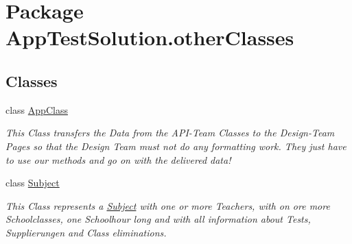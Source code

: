 \hypertarget{namespace_app_test_solution_1_1other_classes}{\section{Package App\-Test\-Solution.\-other\-Classes}
\label{namespace_app_test_solution_1_1other_classes}
}
\subsection*{Classes}
\begin{DoxyCompactItemize}
\item 
class \hyperlink{class_app_test_solution_1_1other_classes_1_1_app_class}{App\-Class}
\begin{DoxyCompactList}\small\item\em This Class transfers the Data from the A\-P\-I-\/\-Team Classes to the Design-\/\-Team Pages so that the Design Team must not do any formatting work. They just have to use our methods and go on with the delivered data! \end{DoxyCompactList}\item 
class \hyperlink{class_app_test_solution_1_1other_classes_1_1_subject}{Subject}
\begin{DoxyCompactList}\small\item\em This Class represents a \hyperlink{class_app_test_solution_1_1other_classes_1_1_subject}{Subject} with one or more Teachers, with on ore more Schoolclasses, one Schoolhour long and with all information about Tests, Supplierungen and Class eliminations. \end{DoxyCompactList}\end{DoxyCompactItemize}
